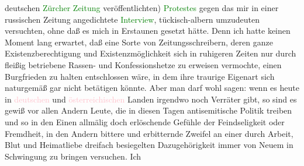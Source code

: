 {{{                        deutschen \textcolor{green}{Zürcher Zeitung} veröffentlichten) \textcolor{green}{Protestes} gegen das mir in
                        einer russischen Zeitung angedichtete \textcolor{green}{Interview}, tückisch-albern umzudeuten versuchten, ohne daß es mich
                        in Erstaunen gesetzt hätte. Denn ich hatte keinen Moment lang erwartet, daß
                        eine Sorte von Zeitungsschreibern, deren ganze Existenzberechtigung und
                        Existenzmöglichkeit sich in ruhigeren Zeiten nur durch fleißig betriebene
                        Rassen- und Konfessionshetze zu erweisen vermochte, einen Burgfrieden zu
                        halten entschlossen wäre, in dem ihre traurige Eigenart sich naturgemäß gar
                        nicht betätigen könnte. Aber man darf wohl sagen: wenn es heute in \textcolor{pink}{deutschen} und \textcolor{pink}{österreichischen} Landen irgendwo noch Verräter gibt, so sind es
                        gewiß vor allen Andern Leute, die in diesen Tagen antisemitische Politik
                        treiben und so in den Einen allmälig doch erlöschende Gefühle der
                        Feindseligkeit oder Fremdheit, in den Andern bittere und erbitternde Zweifel
                        an einer durch Arbeit, Blut und Heimatliebe dreifach besiegelten
                        Dazugehörigkeit immer von Neuem in Schwingung zu bringen versuchen. Ich
}}}
